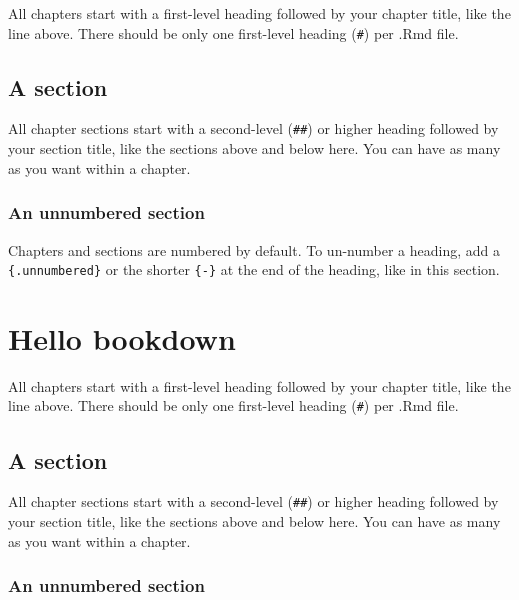 \documentclass[
]{book}
\theoremstyle{definition}
\theoremstyle{definition}
\theoremstyle{definition}
\theoremstyle{definition}
\theoremstyle{remark}
\begin{document}
All chapters start with a first-level heading followed by your chapter title, like the line above. There should be only one first-level heading (\texttt{\#}) per .Rmd file.

\hypertarget{a-section-4}{%
\section{A section}\label{a-section-4}}

All chapter sections start with a second-level (\texttt{\#\#}) or higher heading followed by your section title, like the sections above and below here. You can have as many as you want within a chapter.

\hypertarget{an-unnumbered-section-4}{%
\subsection*{An unnumbered section}\label{an-unnumbered-section-4}}

Chapters and sections are numbered by default. To un-number a heading, add a \texttt{\{.unnumbered\}} or the shorter \texttt{\{-\}} at the end of the heading, like in this section.

\hypertarget{hello-bookdown-5}{%
\chapter{Hello bookdown}\label{hello-bookdown-5}}

All chapters start with a first-level heading followed by your chapter title, like the line above. There should be only one first-level heading (\texttt{\#}) per .Rmd file.

\hypertarget{a-section-5}{%
\section{A section}\label{a-section-5}}

All chapter sections start with a second-level (\texttt{\#\#}) or higher heading followed by your section title, like the sections above and below here. You can have as many as you want within a chapter.

\hypertarget{an-unnumbered-section-5}{%
\subsection*{An unnumbered section}\label{an-unnumbered-section-5}}
\end{document}
